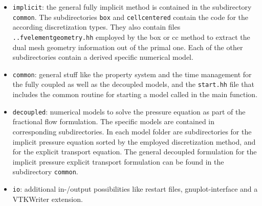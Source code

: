 \begin{itemize}

\item \texttt{implicit}:
the general fully implicit method is contained in the subdirectory \texttt{common}.
The subdirectories \texttt{box} and \texttt{cellcentered} contain the code for the according
discretization types. They also contain files \texttt{..fvelementgeometry.hh} employed
by the box or cc method to extract the dual mesh geometry information out of the primal one.
Each of the other subdirectories contain a derived specific numerical model.

\item \texttt{common}:
general stuff like the property system and the time management for the
fully coupled as well as the decoupled models,
and the \texttt{start.hh} file that includes the common routine for starting a model called in the main function.

\item \texttt{decoupled}:
 numerical models to solve the pressure equation as part of the fractional flow
 formulation. The specific models are contained
 in corresponding subdirectories. In each model folder are subdirectories for the
 implicit pressure equation sorted by the employed discretization method, and for the
 explicit transport equation. The general decoupled formulation for the implicit
 pressure explicit transport formulation can be found in the subdirectory \texttt{common}.




\item \texttt{io}: additional in-/output possibilities like restart files, gnuplot-interface
and a VTKWriter extension.


\end{itemize}
